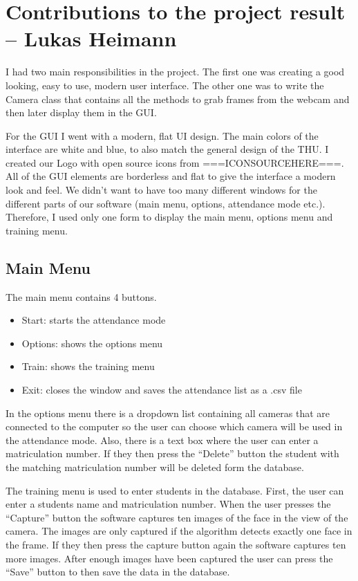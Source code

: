 \documentclass[12pt, a4paper]{article}
\begin{document}
\newpage


\section{Contributions to the project result – Lukas Heimann}
I had two main responsibilities in the project. The first one was creating a good looking, easy to use, modern user interface. The other one was to write the Camera class that contains all the methods to grab frames from the webcam and then later display them in the GUI.

For the GUI I went with a modern, flat UI design. The main colors of the interface are white and blue, to also match the general design of the THU. I created our Logo with open source icons from ===ICONSOURCEHERE===. All of the GUI elements are borderless and flat to give the interface a modern look and feel. We didn’t want to have too many different windows for the different parts of our software (main menu, options, attendance mode etc.). Therefore, I used only one form to display the main menu, options menu and training menu.

\subsection{Main Menu}
The main menu contains 4 buttons.
\begin{itemize}
\item Start: starts the attendance mode
\item Options: shows the options menu
\item Train: shows the training menu
\item Exit: closes the window and saves the attendance list as a .csv file
\end{itemize}

In the options menu there is a dropdown list containing all cameras that are connected to the computer so the user can choose which camera will be used in the attendance mode. Also, there is a text box where the user can enter a matriculation number. If they then press the “Delete” button the student with the matching matriculation number will be deleted form the database. 

The training menu is used to enter students in the database. First, the user can enter a students name and matriculation number.  When the user presses the “Capture” button the software captures ten images of the face in the view of the camera. The images are only captured if the algorithm detects exactly one face in the frame. If they then press the capture button again the software captures ten more images. After enough images have been captured the user can press the “Save” button to then save the data in the database. 
\end{document}
